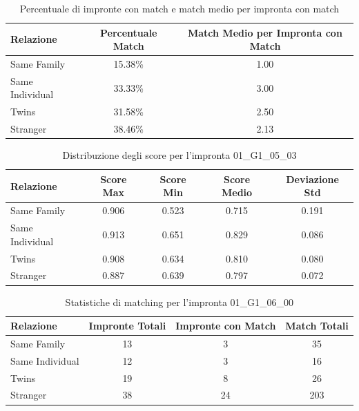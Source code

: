 \begin{table}[htbp]
\centering
\caption{Percentuale di impronte con match e match medio per impronta con match}
\label{tab:match_percentage_01_G1_05_03}
\begin{tabular}{|l|c|c|}
\hline
\textbf{Relazione} & \textbf{Percentuale Match} & \textbf{Match Medio per Impronta con Match} \\
\hline
Same Family & 15.38\% & 1.00 \\
\hline
Same Individual & 33.33\% & 3.00 \\
\hline
Twins & 31.58\% & 2.50 \\
\hline
Stranger & 38.46\% & 2.13 \\
\hline
\end{tabular}
\end{table}


\begin{table}[htbp]
\centering
\caption{Distribuzione degli score per l'impronta 01\_G1\_05\_03}
\label{tab:scores_01_G1_05_03}
\begin{tabular}{|l|c|c|c|c|}
\hline
\textbf{Relazione} & \textbf{Score Max} & \textbf{Score Min} & \textbf{Score Medio} & \textbf{Deviazione Std} \\
\hline
Same Family & 0.906 & 0.523 & 0.715 & 0.191 \\
\hline
Same Individual & 0.913 & 0.651 & 0.829 & 0.086 \\
\hline
Twins & 0.908 & 0.634 & 0.810 & 0.080 \\
\hline
Stranger & 0.887 & 0.639 & 0.797 & 0.072 \\
\hline
\end{tabular}
\end{table}


\begin{table}[htbp]
\centering
\caption{Statistiche di matching per l'impronta 01\_G1\_06\_00}
\label{tab:results_01_G1_06_00}
\begin{tabular}{|l|c|c|c|}
\hline
\textbf{Relazione} & \textbf{Impronte Totali} & \textbf{Impronte con Match} & \textbf{Match Totali} \\
\hline
Same Family & 13 & 3 & 35 \\
\hline
Same Individual & 12 & 3 & 16 \\
\hline
Twins & 19 & 8 & 26 \\
\hline
Stranger & 38 & 24 & 203 \\
\hline
\end{tabular}
\end{table}


